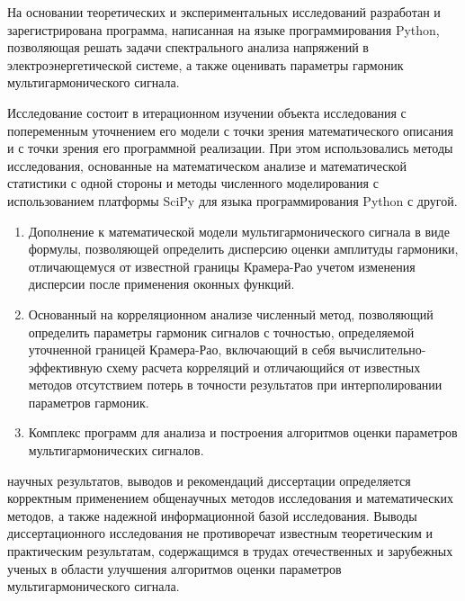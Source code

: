 На основании теоретических и экспериментальных исследований разработан и зарегистрирована программа, написанная на языке программирования Python, позволяющая решать задачи спектрального анализа напряжений в электроэнергетической системе, а также оценивать параметры гармоник мультигармонического сигнала.


{\methods} 
Исследование состоит в итерационном изучении объекта исследования с попеременным уточнением его модели с точки зрения математического описания и с точки зрения его программной реализации. При этом использовались методы исследования, основанные на математическом анализе и математической статистики с одной стороны и методы численного моделирования с использованием платформы SciPy для языка программирования Python с другой.


\newpage
{}
\begin{enumerate}
  \item Дополнение к математической модели мультигармонического сигнала в виде формулы, позволяющей определить дисперсию оценки амплитуды гармоники, отличающемуся от известной границы Крамера-Рао учетом изменения дисперсии после применения оконных функций.
  \item Основанный на корреляционном анализе численный метод, позволяющий определить параметры гармоник сигналов с точностью, определяемой уточненной границей Крамера-Рао, включающий в себя вычислительно-эффективную схему расчета корреляций и отличающийся от известных методов отсутствием потерь в точности результатов при интерполировании параметров гармоник.
  \item Комплекс программ для анализа и построения алгоритмов оценки параметров мультигармонических сигналов.
\end{enumerate}

{\reliability} 
научных результатов, выводов и рекомендаций диссертации определяется корректным применением
общенаучных методов исследования и математических методов, а также
надежной информационной базой исследования. Выводы диссертационного исследования не противоречат известным теоретическим и практическим результатам, содержащимся в трудах отечественных и зарубежных ученых в области улучшения алгоритмов оценки параметров мультигармонического сигнала.


